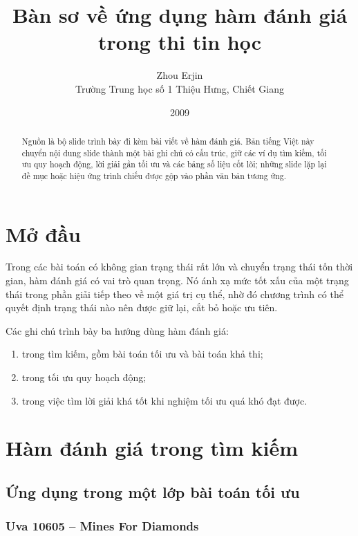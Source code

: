 \documentclass[11pt]{article}
\title{Bàn sơ về ứng dụng hàm đánh giá trong thi tin học}
\author{Zhou Erjin\\Trường Trung học số 1 Thiệu Hưng, Chiết Giang}
\date{2009}
\begin{document}
\maketitle


\begin{abstract}
Nguồn là bộ slide trình bày đi kèm bài viết về hàm đánh giá. Bản tiếng Việt
này chuyển nội dung slide thành một bài ghi chú có cấu trúc, giữ các ví dụ
tìm kiếm, tối ưu quy hoạch động, lời giải gần tối ưu và các bảng số liệu cốt
lõi; những slide lặp lại đề mục hoặc hiệu ứng trình chiếu được gộp vào phần
văn bản tương ứng.
\end{abstract}

\section*{Mở đầu}

Trong các bài toán có không gian trạng thái rất lớn và chuyển trạng thái tốn
thời gian, hàm đánh giá có vai trò quan trọng. Nó ánh xạ mức tốt xấu của một
trạng thái trong phần giải tiếp theo về một giá trị cụ thể, nhờ đó chương
trình có thể quyết định trạng thái nào nên được giữ lại, cắt bỏ hoặc ưu tiên.

Các ghi chú trình bày ba hướng dùng hàm đánh giá:
\begin{enumerate}
  \item trong tìm kiếm, gồm bài toán tối ưu và bài toán khả thi;
  \item trong tối ưu quy hoạch động;
  \item trong việc tìm lời giải khá tốt khi nghiệm tối ưu quá khó đạt được.
\end{enumerate}

\section{Hàm đánh giá trong tìm kiếm}

\subsection{Ứng dụng trong một lớp bài toán tối ưu}

\subsubsection*{Uva 10605 -- Mines For Diamonds}
\end{document}
